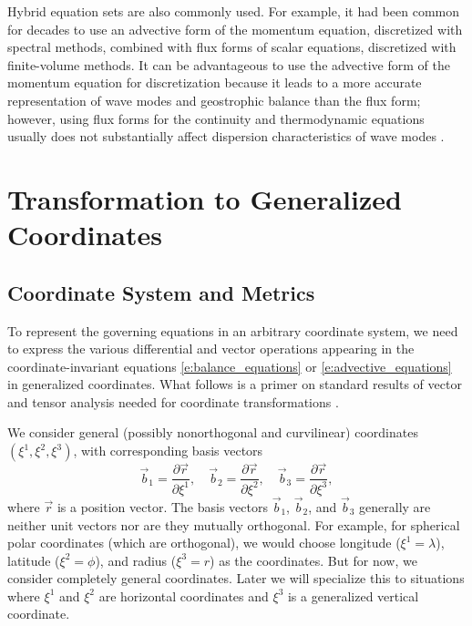 \documentclass{report}
\begin{document}
Hybrid equation sets are also commonly used. For example, it had been common for decades to use an advective form of the momentum equation, discretized with spectral methods, combined with flux forms of scalar equations, discretized with finite-volume methods. It can be advantageous to use the advective form of the momentum equation for discretization because it leads to a more accurate representation of wave modes and geostrophic balance than the flux form; however, using flux forms for the continuity and thermodynamic equations usually does not substantially affect dispersion characteristics of wave modes \citep{Thuburn05n}.

\section{Transformation to Generalized Coordinates}

\subsection{Coordinate System and Metrics}

To represent the governing equations in an arbitrary coordinate system, we need to express the various differential and vector operations appearing in the coordinate-invariant equations \eqref{e:balance_equations} or \eqref{e:advective_equations} in generalized coordinates. What follows is a  primer on standard results of vector and tensor analysis needed for coordinate transformations \citep[see, e.g.,][chapter~4]{Arfken13}.

We consider general (possibly nonorthogonal and curvilinear) coordinates $(\xi^1, \xi^2, \xi^3)$, with corresponding basis vectors 
\[
\vec{b}_1 = \frac{\partial \vec{r}}{\partial \xi^1}, \quad \vec{b}_2 = \frac{\partial \vec{r}}{\partial \xi^2}, \quad\vec{b}_3 = \frac{\partial \vec{r}}{\partial \xi^3},
\]
where $\vec{r}$ is a position vector. The basis vectors $\vec{b}_1$, $\vec{b}_2$, and $\vec{b}_3$ generally are neither unit vectors nor are they mutually orthogonal. For example, for spherical polar coordinates (which are orthogonal), we would choose longitude ($\xi^1 = \lambda$), latitude ($\xi^2 = \phi$), and radius ($\xi^3 = r$) as the coordinates. But for now, we consider completely general coordinates. Later we will specialize this to situations where $\xi^1$ and $\xi^2$ are horizontal coordinates and $\xi^3$ is a generalized vertical coordinate.
\end{document}
